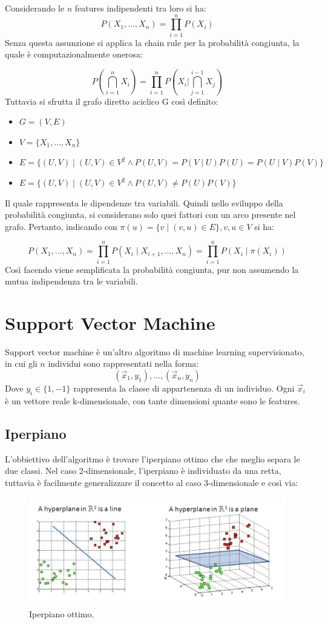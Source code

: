\documentclass[oneside]{book}
\begin{document}
\noindent Considerando le $n$ features indipendenti tra loro si ha:
$$P(X_1, ..., X_n) = \prod\limits_{i=1}^{n}P(X_i) $$
Senza questa assunzione si applica la chain rule per la probabilità congiunta, la quale è computazionalmente onerosa:

\[ 
P \left( \bigcap_{i=1}^n X_i \right) = 
\prod\limits_{i=1}^{n}P
\left( X_i  \bigg\vert
\bigcap_{j=1}^{i-1} X_j \right)
\]
Tuttavia si sfrutta il grafo diretto aciclico G così definito:
\begin{itemize}
	\item $G = (V, E)$
	\item $V = \{X_1, ..., X_n\}$
	\item $E = \{(U,V) \mid (U,V) \in V^2 \land P(U, V) = P(V \mid U)P(U) = P(U \mid V)P(V) \}$
	\item $E = \{(U,V) \mid (U,V) \in V^2 \land P(U, V) \neq P(U)P(V) \}$
\end{itemize}
Il quale rappresenta le dipendenze tra variabili. Quindi nello sviluppo della probabilità congiunta, si considerano solo quei fattori con un arco presente nel grafo. Pertanto, indicando con $\pi(u) = \{v \mid (v, u) \in E\}, v,u \in V$ si ha:


$$P(X_1, ..., X_n) = \prod\limits_{i=1}^{n}P(X_i \mid X_{i+1}, ..., X_{n}) = \prod\limits_{i=1}^{n}P(X_i \mid \pi(X_i)) $$
Così facendo viene semplificata la probabilità congiunta, pur non assumendo la mutua indipendenza tra le variabili.

\newpage
\section{Support Vector Machine}
Support vector machine è un'altro algoritmo di machine learning supervisionato, in cui gli $n$ individui sono rappresentati nella forma:
$$(\vec{x}_1, y_1),...,(\vec{x}_n, y_n)$$
Dove $y_i \in \{1, -1\}$ rappresenta la classe di appartenenza di un individuo. Ogni $\vec{x}_i$ è un vettore reale k-dimensionale, con tante dimensioni quante sono le features.

\subsection{Iperpiano}
L'obbiettivo dell'algoritmo è trovare l'iperpiano ottimo che che meglio separa le due classi.
Nel caso 2-dimensionale, l'iperpiano è individuato da una retta, tuttavia è facilmente generalizzare il concetto al caso 3-dimensionale e così via:
\begin{figure}[H]
	\centering
	\includegraphics[width=12cm]{assets/svm-hyperplane.png}
	\caption[Caption for LOF]{Iperpiano ottimo.\footnotemark}
	\label{fig:svm-2d}
\end{figure}
\end{document}
